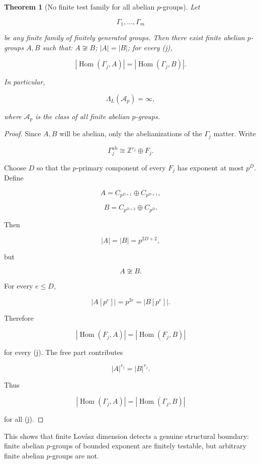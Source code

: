 \documentclass[11pt]{article}
\newtheorem{theorem}{Theorem}[section]
\begin{document}
\begin{theorem}[No finite test family for all abelian $p$-groups]
Let

\[
\Gamma_1,\ldots,\Gamma_m
\]

be any finite family of finitely generated groups. Then there exist finite abelian $p$-groups $A,B$ such that: $A\not\cong B$; $|A|=|B|$; for every (j),

\[
|\operatorname{Hom}(\Gamma_j,A)|=|\operatorname{Hom}(\Gamma_j,B)|.
\]

In particular,

\[
\Lambda_L(\mathcal A_p)=\infty,
\]

where $\mathcal A_p$ is the class of all finite abelian $p$-groups.

\end{theorem}

\begin{proof}
Since $A,B$ will be abelian, only the abelianizations of the $\Gamma_j$ matter. Write

\[
\Gamma_j^{\mathrm{ab}}
\cong
\mathbb Z^{r_j}\oplus F_j.
\]

Choose $D$ so that the $p$-primary component of every $F_j$ has exponent at most $p^D$. Define

\[
A=C_{p^{D+1}}\oplus C_{p^{D+1}},
\]

\[
B=C_{p^{D+2}}\oplus C_{p^D}.
\]

Then

\[
|A|=|B|=p^{2D+2},
\]

but

\[
A\not\cong B.
\]

For every $e\le D$,

\[
|A[p^e]|=
p^{2e}=|B[p^e]|.
\]

Therefore

\[
|\operatorname{Hom}(F_j,A)|
=|\operatorname{Hom}(F_j,B)|
\]

for every (j). The free part contributes

\[
|A|^{r_j}
=|B|^{r_j}.
\]

Thus

\[
|\operatorname{Hom}(\Gamma_j,A)|
=|\operatorname{Hom}(\Gamma_j,B)|
\]

for all (j).

\end{proof}

This shows that finite Lovász dimension detects a genuine structural boundary: finite abelian $p$-groups of bounded exponent are finitely testable, but arbitrary finite abelian $p$-groups are not.
\end{document}
